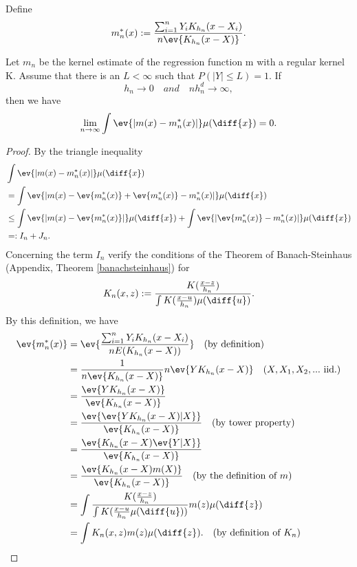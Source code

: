 Define \[m_n^*(x) := \frac{\sum_{i=1}^{n} Y_i K_{h_n}(x-X_i)}{n \ev{K_{h_n}(x-X)}}. \]

\begin{lemma} \label{lemma23.8}
Let $m_n$ be the kernel estimate of the regression function m with a regular kernel K. Assume that there is an $L<\infty$ such that $P(|Y| \leq L) = 1.$ If \[h_n \to 0 \quad and \quad nh_n^d \to \infty,\] then we have
\[\lim_{n\to\infty} \int \ev{|m(x) - m_n^*(x)|} \mu(\diff{x}) = 0.\]
\end{lemma}
\begin{proof}
    By the triangle inequality
    \begin{align*}
        &\int \ev{|m(x)-m_n^*(x)|}\mu(\diff{x}) \\
        &= \int \ev{|m(x)-\ev{m_n^*(x)}+\ev{m_n^*(x)}-m_n^*(x)|}\mu(\diff{x}) \\
        &\leq \int \ev{|m(x)-\ev{m_n^*(x)}|}\mu(\diff{x}) + \int \ev{|\ev{m_n^*(x)}-m_n^*(x)|}\mu(\diff{x}) \\
        &=: I_n + J_n.
    \end{align*}
    Concerning the term $I_n$ verify the conditions of the Theorem of Banach-Steinhaus (Appendix, Theorem \ref{banachsteinhaus}) for
    \[K_n(x,z) := \frac{K(\frac{x-z}{h_n})}{\int K(\frac{x-u}{h_n}) \mu(\diff{u})}.\]
    By this definition, we have
    \begin{align} \label{expofmn*}
        \ev{m_n^*(x)}
        &= \ev{\frac{\sum_{i=1}^{n} Y_i K_{h_n}(x-X_i)}{n E(K_{h_n}(x-X))}} \quad\text{(by definition)} \\
        &= \frac{1}{n \ev{K_{h_n}(x-X)}} n\ev{Y K_{h_n}(x-X)} \quad\text{($X,X_1,X_2,...$ iid.)} \nonumber \\ 
        &= \frac{\ev{YK_{h_n}(x-X)}}{\ev{K_{h_n}(x-X)}} \nonumber \\
        &= \frac{\ev{\ev{Y K_{h_n}(x-X)|X}}}{\ev{K_{h_n}(x-X)}} \quad\text{(by tower property)} \nonumber \\
        &= \frac{\ev{K_{h_n}(x-X)\ev{Y|X}}}{\ev{K_{h_n}(x-X)}} \nonumber \\
        &= \frac{\ev{K_{h_n}(x-X)m(X)}}{\ev{K_{h_n}(x-X)}} \quad\text{(by the definition of $m$)}\nonumber \\
        &= \int \frac{K(\frac{x-z}{h_n})}{\int K(\frac{x-u}{h_n} \mu(\diff{u}))} m(z) \mu(\diff{z}) \nonumber \\
        &= \int K_n(x,z) m(z) \mu(\diff{z}). \quad\text{(by definition of $K_n$)}\nonumber 
    \end{align}

\end{proof}
